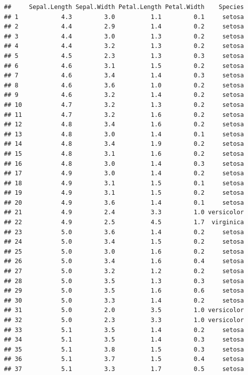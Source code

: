 \documentclass[
]{article}
\begin{document}
\begin{verbatim}
##     Sepal.Length Sepal.Width Petal.Length Petal.Width    Species
## 1            4.3         3.0          1.1         0.1     setosa
## 2            4.4         2.9          1.4         0.2     setosa
## 3            4.4         3.0          1.3         0.2     setosa
## 4            4.4         3.2          1.3         0.2     setosa
## 5            4.5         2.3          1.3         0.3     setosa
## 6            4.6         3.1          1.5         0.2     setosa
## 7            4.6         3.4          1.4         0.3     setosa
## 8            4.6         3.6          1.0         0.2     setosa
## 9            4.6         3.2          1.4         0.2     setosa
## 10           4.7         3.2          1.3         0.2     setosa
## 11           4.7         3.2          1.6         0.2     setosa
## 12           4.8         3.4          1.6         0.2     setosa
## 13           4.8         3.0          1.4         0.1     setosa
## 14           4.8         3.4          1.9         0.2     setosa
## 15           4.8         3.1          1.6         0.2     setosa
## 16           4.8         3.0          1.4         0.3     setosa
## 17           4.9         3.0          1.4         0.2     setosa
## 18           4.9         3.1          1.5         0.1     setosa
## 19           4.9         3.1          1.5         0.2     setosa
## 20           4.9         3.6          1.4         0.1     setosa
## 21           4.9         2.4          3.3         1.0 versicolor
## 22           4.9         2.5          4.5         1.7  virginica
## 23           5.0         3.6          1.4         0.2     setosa
## 24           5.0         3.4          1.5         0.2     setosa
## 25           5.0         3.0          1.6         0.2     setosa
## 26           5.0         3.4          1.6         0.4     setosa
## 27           5.0         3.2          1.2         0.2     setosa
## 28           5.0         3.5          1.3         0.3     setosa
## 29           5.0         3.5          1.6         0.6     setosa
## 30           5.0         3.3          1.4         0.2     setosa
## 31           5.0         2.0          3.5         1.0 versicolor
## 32           5.0         2.3          3.3         1.0 versicolor
## 33           5.1         3.5          1.4         0.2     setosa
## 34           5.1         3.5          1.4         0.3     setosa
## 35           5.1         3.8          1.5         0.3     setosa
## 36           5.1         3.7          1.5         0.4     setosa
## 37           5.1         3.3          1.7         0.5     setosa

\end{verbatim}
\end{document}
